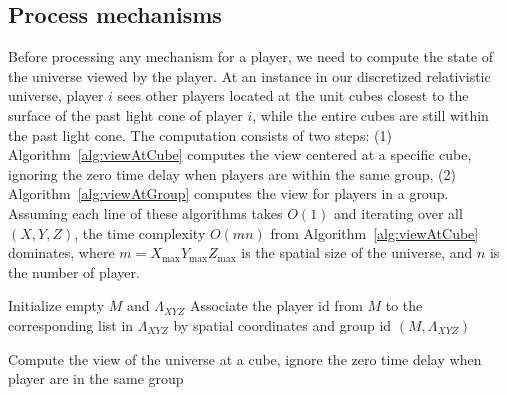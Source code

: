 \documentclass{svproc}
\begin{document}
\subsection{Process mechanisms} \label{ssec:mechanisms}

Before processing any mechanism for a player, 
we need to compute the state of the universe viewed by the player.
At an instance in our discretized relativistic universe,
player $i$ sees other players located at the unit cubes closest
to the surface of the past light cone of player $i$,
while the entire cubes are still within the past light cone.
The computation consists of two steps:
(1) Algorithm~\ref{alg:viewAtCube} computes the view centered at a specific cube, 
ignoring the zero time delay when players are within the same group,
(2) Algorithm~\ref{alg:viewAtGroup} computes the view for players in a group.
Assuming each line of these algorithms takes $O(1)$ and iterating over all $(X, Y, Z)$,
the time complexity $O(mn)$ from Algorithm~\ref{alg:viewAtCube} dominates,
where $m=X_{\textrm{max}} Y_{\textrm{max}} Z_{\textrm{max}}$ is the spatial size of the universe,
and $n$ is the number of player.

\begin{algorithm}

Initialize empty $M$ and $\Lambda_{XYZ}$\;
Associate the player id from $M$ to the corresponding list in $\Lambda_{XYZ}$ by spatial coordinates and group id\;
\Return $(M, \Lambda_{XYZ})$

\caption{Compute the view of the universe at a cube, ignore the zero time delay when player are in the same group}
\label{alg:viewAtCube}
\end{algorithm}
\end{document}
